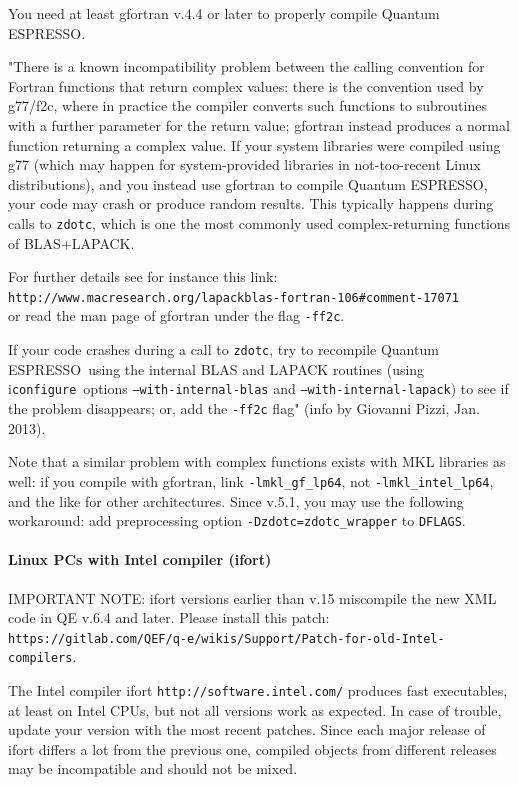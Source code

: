 \documentclass[12pt,a4paper]{article}
\def\qe{{\sc Quantum ESPRESSO}}
\def\configure{\texttt{configure}}
\begin{document}
You need at least gfortran v.4.4 or later to properly compile \qe.

"There is a known incompatibility problem between the calling
convention for Fortran functions that return complex values: there is the
convention used by
g77/f2c, where in practice the compiler converts such functions to subroutines
with a further parameter for the return value; gfortran instead produces a
normal function returning a complex value.
If your system libraries were compiled using g77 (which may happen for
system-provided libraries in not-too-recent Linux distributions),
and you instead use gfortran to compile \qe, your code
may crash or produce random results. This typically happens
during calls to \texttt{zdotc}, which is one the most commonly used
complex-returning functions of BLAS+LAPACK.

For further details see for instance this link:\\
\texttt{http://www.macresearch.org/lapackblas-fortran-106\#comment-17071}\\
or read the man page of gfortran under the flag \texttt{-ff2c}.

If your code crashes during a call to \texttt{zdotc},
try to recompile \qe\ using the internal BLAS and LAPACK
routines (using i\configure\ options \texttt{--with-internal-blas} and
\texttt{--with-internal-lapack})
to see if the problem disappears; or, add the \texttt{-ff2c} flag"
(info by Giovanni Pizzi, Jan. 2013).

Note that a similar problem with complex functions exists with MKL libraries
as well: if you compile with gfortran, link \texttt{-lmkl\_gf\_lp64},
not \texttt{-lmkl\_intel\_lp64}, and the like for other architectures.
Since v.5.1, you may use the following workaround:
add preprocessing option \texttt{-Dzdotc=zdotc\_wrapper} to \texttt{DFLAGS}.

\paragraph{Linux PCs with Intel compiler (ifort)}

IMPORTANT NOTE: ifort versions earlier than v.15 miscompile the new
XML code in QE v.6.4 and later. Please install this patch:\\
\texttt{https://gitlab.com/QEF/q-e/wikis/Support/Patch-for-old-Intel-compilers}.

The Intel compiler ifort \texttt{http://software.intel.com/}
produces fast executables, at least on Intel CPUs, but not all versions
work as expected. In case of trouble, update your version
with the most recent patches. Since each major release of ifort
differs a lot from the previous one, compiled objects from different
releases may be incompatible and should not be mixed.
\end{document}
